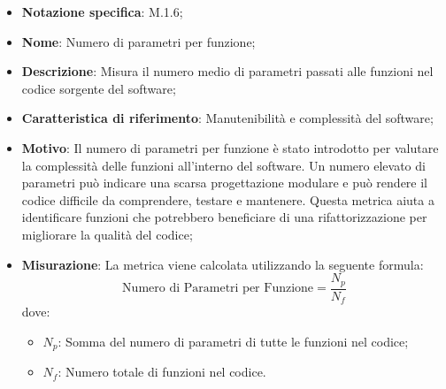 \begin{itemize}
    \item \textbf{Notazione specifica}: M.1.6;
    \item \textbf{Nome}: Numero di parametri per funzione;
    \item \textbf{Descrizione}: Misura il numero medio di parametri passati alle funzioni nel codice sorgente del software;
    \item \textbf{Caratteristica di riferimento}: Manutenibilità e complessità del software;
    \item \textbf{Motivo}: Il numero di parametri per funzione è stato introdotto per valutare la complessità delle funzioni all'interno del software. Un numero elevato di parametri può indicare una scarsa progettazione modulare e può rendere il codice difficile da comprendere, testare e mantenere. Questa metrica aiuta a identificare funzioni che potrebbero beneficiare di una rifattorizzazione per migliorare la qualità del codice;
    \item \textbf{Misurazione}: La metrica viene calcolata utilizzando la seguente formula:
    \[
    \text{Numero di Parametri per Funzione} = \frac{N_{p}}{N_{f}}
    \]
    dove:
    \begin{itemize}
        \item $N_{p}$: Somma del numero di parametri di tutte le funzioni nel codice;
        \item $N_{f}$: Numero totale di funzioni nel codice.
    \end{itemize}
\end{itemize}
